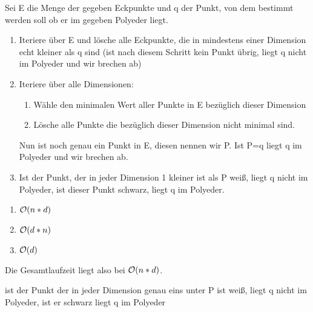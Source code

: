 
Sei E die Menge der gegeben Eckpunkte und q der Punkt, von dem bestimmt werden soll ob er im gegeben Polyeder liegt. \\
\begin{enumerate}
\item Iteriere über E und lösche alle Eckpunkte, die in mindestens einer Dimension echt kleiner als q sind (ist nach diesem Schritt kein Punkt übrig, liegt q nicht im Polyeder und wir brechen ab)
\item Iteriere über alle Dimensionen:
\begin{enumerate}
	\item Wähle den minimalen Wert aller Punkte in E bezüglich dieser Dimension
	\item Lösche alle Punkte die bezüglich dieser Dimension nicht minimal sind.
\end{enumerate}
Nun ist noch genau ein Punkt in E, diesen nennen wir P. Ist P=q liegt q im Polyeder und wir brechen ab.
\item Ist der Punkt, der in jeder Dimension 1 kleiner ist als P weiß, liegt q nicht im Polyeder, ist dieser Punkt schwarz, liegt q im Polyeder.
\end{enumerate}
\begin{enumerate}
\item $\mathcal{O}(n * d)$
\item $\mathcal{O}(d * n)$
\item $\mathcal{O}(d)$
\end{enumerate}
Die Gesamtlaufzeit liegt also bei $\mathcal{O}(n*d)$.


ist der Punkt der in jeder Dimension genau eins unter P ist weiß, liegt q nicht im Polyeder, ist er schwarz liegt q im Polyeder
